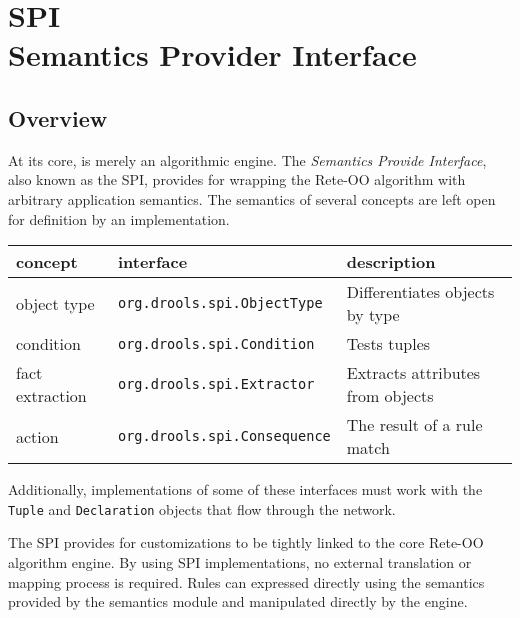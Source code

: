 \chapter[Semantics Provider Interface]{SPI\\\normalsize{Semantics Provider Interface}}

\section{Overview}

At its core, \drools{} is merely an algorithmic engine. The 
\emph{Semantics Provide Interface}, also known as the SPI,
provides for wrapping the \drools{} Rete-OO algorithm with
arbitrary application semantics. The semantics of several concepts are
left open for definition by an implementation.

\medskip

\begin{center}
  \begin{tabular}{|l|l|p{120pt}|}
    \hline
      \textsf{concept} & \textsf{interface} & \textsf{description} \\
    \hline
    \hline
      \footnotesize{object type} %
        & \texttt{\footnotesize{org.drools.spi.ObjectType}} %
        & \footnotesize{Differentiates objects by type} \\
    \hline
      \footnotesize{condition} %
        & \texttt{\footnotesize{org.drools.spi.Condition}} %
        & \footnotesize{Tests tuples}\\
    \hline
      \footnotesize{fact extraction} %
        & \texttt{\footnotesize{org.drools.spi.Extractor}} %
        & \footnotesize{Extracts attributes from objects} \\
    \hline
      \footnotesize{action} %
        & \texttt{\footnotesize{org.drools.spi.Consequence}} %
        & \footnotesize{The result of a rule match}\\
    \hline
  \end{tabular}
\end{center}

\medskip

Additionally, implementations of some of these interfaces must work
with the \verb|Tuple| and \verb|Declaration| objects that flow 
through the network.  

The SPI provides for \drools{} customizations to be tightly linked to
the core Rete-OO algorithm engine.  By using SPI implementations, no
external translation or mapping process is required.  Rules can
expressed directly using the semantics provided by the semantics module
and manipulated directly by the engine.

